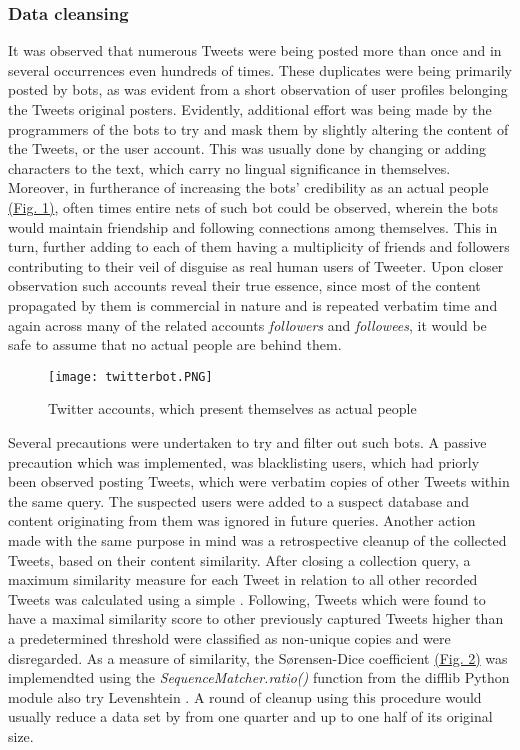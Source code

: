 		\subsubsection*{Data cleansing}
		It was observed that numerous Tweets were being posted more than once and in several occurrences even hundreds of times. These duplicates were being primarily posted by bots, as was evident from a short observation of user profiles belonging the Tweets original posters. Evidently, additional effort was being made by the programmers of the bots to try and mask them by slightly altering the content of the Tweets, or the user account. This was usually done by changing or adding characters to the text, which carry no lingual significance in themselves. Moreover, in furtherance of increasing the bots' credibility as an actual people \hyperref[fig:twitterbot]{(Fig. 1)}, often times entire nets of such bot could be observed, wherein the bots would maintain friendship and following connections among themselves. This in turn, further adding to each of them having a multiplicity of friends and followers contributing to their veil of disguise as real human users of Tweeter. Upon closer observation such accounts reveal their true essence, since most of the content propagated by them is commercial in nature and is repeated verbatim time and again across many of the related accounts \textit{followers} and \textit{followees}, it would be safe to assume that no actual people are behind them. 
		\par
		
		\begin{figure}[h]
			\centering
			\label{fig:twitterbot}
			\texttt{[image: twitterbot.PNG]}
			\caption{Twitter accounts, which present themselves as actual people}
		\end{figure}
		
		\newpage
		\noindent
		Several precautions were undertaken to try and filter out such bots. A passive precaution which was implemented, was blacklisting users, which had priorly been observed posting Tweets, which were verbatim copies of other Tweets within the same query. The suspected users were added to a suspect database and content originating from them was ignored in future queries. Another action made with the same purpose in mind was a retrospective cleanup of the collected Tweets, based on their content similarity. After closing a collection query, a maximum similarity measure for each Tweet in relation to all other recorded Tweets was calculated using a simple . Following, Tweets which were found to have a maximal similarity score to other previously captured Tweets  higher than a predetermined threshold were classified as non-unique copies and were disregarded. As a measure of similarity, the S\o rensen-Dice coefficient\cite{sorensen1948method} \hyperref[fig:sorenson_dice]{(Fig. 2)} was implemendted using the \textit{SequenceMatcher.ratio()} function from the difflib Python module {\color{red} \Large also try Levenshtein }. A round of cleanup using this procedure would usually reduce a data set by from one quarter and up to one half of its original size.
		
